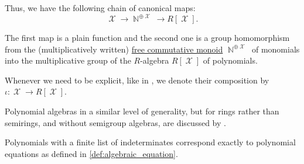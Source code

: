 \begin{definition}
\begin{thmenum}
     Thus, we have the following chain of canonical maps:
    \begin{equation*}
      \mscrX \to \BbbN^{\oplus \mscrX} \to R[\mscrX].
    \end{equation*}

    The first map is a plain function and the second one is a group homomorphism from the (multiplicatively written) \hyperref[def:free_commutative_monoid]{free commutative monoid} \( \BbbN^{\oplus \mscrX} \) of monomials into the multiplicative group of the \( R \)-algebra \( R[\mscrX] \) of polynomials.

    Whenever we need to be explicit, like in , we denote their composition by \( \iota: \mscrX \to R[\mscrX] \).
  \end{thmenum}
\end{definition}
\begin{comments}
  \item Polynomial algebras in a similar level of generality, but for rings rather than semirings, and without semigroup algebras, are discussed by .

  \item Polynomials with a finite list of indeterminates correspond exactly to polynomial equations as defined in \cref{def:algebraic_equation}.
\end{comments}

